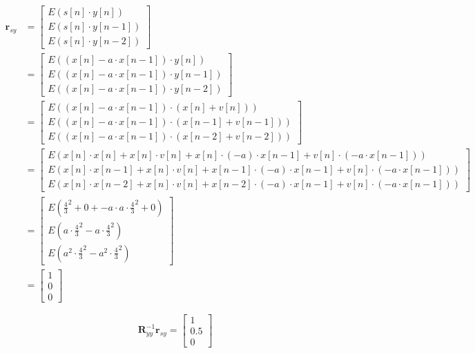 $$
\begin{aligned}
\textbf{r}_{sy}&=\begin{bmatrix}
E \left(s[n] \cdot y[n]\right)\\
E \left(s[n] \cdot y[n-1]\right)\\
E \left(s[n] \cdot y[n-2]\right)
\end{bmatrix}\\
&=
\begin{bmatrix}
E \left(\left(x[n]-a\cdot x[n-1]\right) \cdot y[n]\right)\\
E \left(\left(x[n]-a\cdot x[n-1]\right) \cdot y[n-1]\right)\\
E \left(\left(x[n]-a\cdot x[n-1]\right) \cdot y[n-2]\right)
\end{bmatrix}\\
&=
\begin{bmatrix}
E \left( \left(x[n]-a\cdot x[n-1]\right) \cdot \left( x[n]+ v[n] \right) \right)\\
E \left(\left(x[n]-a\cdot x[n-1]\right) \cdot \left(x[n-1]+ v[n-1]\right)\right)\\
E \left(\left(x[n]-a\cdot x[n-1]\right) \cdot \left(x[n-2]+ v[n-2]\right)\right)
\end{bmatrix}\\
&= 
\begin{bmatrix}
E \left(x[n]\cdot x[n]+x[n]\cdot v[n]+x[n]\cdot (-a)\cdot x[n-1]+v[n]\cdot (-a\cdot x[n-1])\right)\\
E \left(x[n]\cdot x[n-1]+x[n]\cdot v[n]+x[n-1]\cdot (-a)\cdot x[n-1]+v[n]\cdot (-a\cdot x[n-1])\right)\\
E \left(x[n]\cdot x[n-2]+x[n]\cdot v[n]+x[n-2]\cdot (-a)\cdot x[n-1]+v[n]\cdot (-a\cdot x[n-1])\right)
\end{bmatrix}\\
&= 
\begin{bmatrix}
	E \left(\frac{4}{3}^2+0+-a\cdot a\cdot \frac{4}{3}^2 +0\right)\\
	E \left(a\cdot \frac{4}{3}^2-a\cdot \frac{4}{3}^2\right)\\
	E \left(a^2\cdot \frac{4}{3}^2-a^2\cdot \frac{4}{3}^2\right)
\end{bmatrix}\\
&= 
\begin{bmatrix}
	1\\
	0\\
	0
\end{bmatrix}
\end{aligned}
$$


$$
\boldsymbol{R}_{yy}^{-1} \boldsymbol{r}_{sy}=
\begin{bmatrix}
1\\
0.5\\
0
\end{bmatrix}
$$

